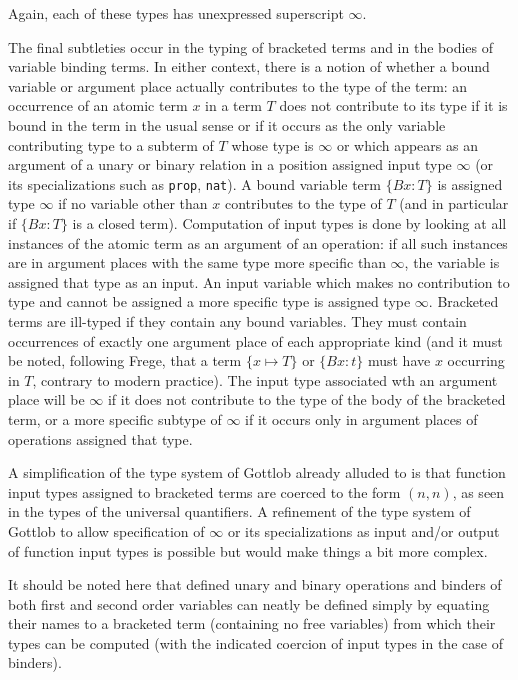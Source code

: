\documentclass{article}
\begin{document}
{{Again, each of these types has unexpressed superscript $\infty$.

The final subtleties occur in the typing of bracketed terms and in the bodies of variable binding terms.  In either context, there is a notion of whether a bound variable or argument place actually contributes to the type of the term:   an occurrence of an atomic term $x$ in a term $T$ does not contribute to its type if it is bound in the term in the usual sense or if it occurs as the only variable contributing type to a subterm of $T$ whose type is $\infty$ or which appears as an argument of a unary or binary relation in a position assigned input type $\infty$ (or its specializations such as {\tt prop}, {\tt nat}).  A bound variable term $\{Bx:T\}$ is assigned type $\infty$ if no variable other than $x$ contributes to the type of $T$ (and in particular if $\{Bx:T\}$ is a closed term).  Computation of input types is done by looking at all instances of the atomic term as an argument of an operation:  if all such instances are in argument places with the same type more specific than $\infty$, the variable is assigned that type as an input.  An input variable which makes no contribution to type and cannot be assigned a more specific type is assigned type $\infty$.  Bracketed terms are ill-typed if they contain any bound variables.  They must contain occurrences of exactly one argument place of each appropriate kind (and it must be noted, following Frege, that a term $\{x \mapsto T\}$ or $\{Bx:t\}$ must have $x$ occurring in $T$, contrary to modern practice).  The input type associated wth an argument place will be $\infty$ if it does not contribute to the type of the body of the bracketed term, or a more specific subtype of $\infty$ if it occurs only in argument places of operations assigned that type.

A simplification of the type system of Gottlob already alluded to is that function input types assigned to bracketed terms are coerced to the form $(n,n)$, as seen in the
types of the universal quantifiers.  A refinement of the type system of Gottlob to allow specification of $\infty$ or its specializations as input and/or output of function input types is possible but would make things a bit more complex.

It should be noted here that defined unary and binary operations and binders of both first and second order variables can neatly be defined simply by equating their names to
a bracketed term (containing no free variables) from which their types can be computed (with the indicated coercion of input types in the case of binders).

}}
\end{document}
